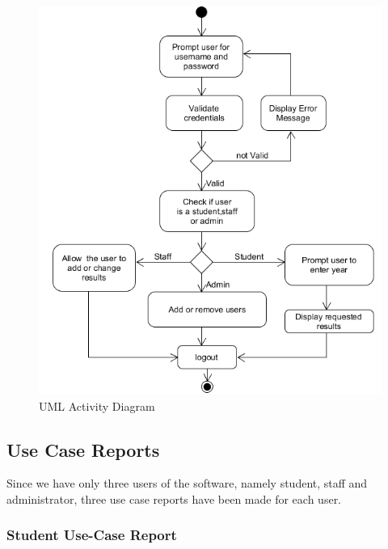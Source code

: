 \documentclass[10pt,onecolumn]{RequimentsGathering}
\begin{document}
\begin{center}
\begin{figure}[h]
\centering
\includegraphics[trim={0cm 0 0 0},clip]{UML-Activity}
\caption{UML Activity Diagram}
\end{figure}
\end{center}

\subsection{Use Case Reports}
Since we have only three users of the software, namely student, staff and administrator, three use case reports have been made for each user. 
 

\clearpage
\subsubsection{Student Use-Case Report}$\;\;\;\;\;\;\;\;\;\;\;\;\;\;\;\;\;\;\;\;\;\;\;$
\end{document}

